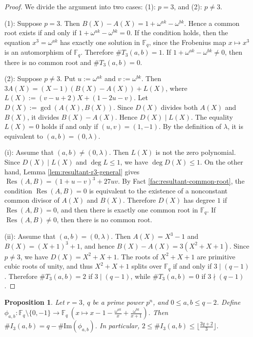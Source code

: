 \documentclass[10pt,a4paper]{article}
\newtheorem{prop}[thm]{Proposition}
\newcommand{\Res}{\operatorname{Res}}
\numberwithin{equation}{section}
\begin{document}
\begin{proof}
We divide the argument into two cases: \textup{(1)}: $p=3$, and \textup{(2)}: $p\neq 3$.

\noindent\textup{(1)}: Suppose $p=3$. Then $B(X)-A(X)=1+\omega^{ak}-\omega^{bk}$. Hence a common root exists if and only if $1+\omega^{ak}-\omega^{bk}=0$. If the condition holds, then the equation $x^3=\omega^{ak}$ has exactly one solution in $\mathbb{F}_q$, since the Frobenius map $x\mapsto x^3$ is an automorphism of $\mathbb{F}_q$. Therefore $\#T_3(a,b)=1$. If $1+\omega^{ak}-\omega^{bk}\neq 0$, then there is no common root and $\#T_3(a,b)=0$.

\noindent\textup{(2)}: Suppose $p\neq 3$. Put $u:=\omega^{ak}$ and $v:=\omega^{bk}$. Then $3A(X)=(X-1)(B(X)-A(X))+L(X)$, where $L(X):=(v-u+2)X+(1-2u-v)$. Let $D(X):=\gcd(A(X),B(X))$. Since $D(X)$ divides both $A(X)$ and $B(X)$, it divides $B(X)-A(X)$. Hence $D(X)\mid L(X)$. The equality $L(X)=0$ holds if and only if $(u,v)=(1,-1)$. By the definition of $\lambda$, it is equivalent to $(a,b)=(0,\lambda)$.

\textup{(i)}: Assume that $(a,b)\neq(0,\lambda)$. Then $L(X)$ is not the zero polynomial. Since $D(X)\mid L(X)$ and $\deg L\le1$, we have $\deg D(X)\le1$. On the other hand, Lemma \ref{lem:resultant-r3-general} gives $\Res(A,B)=(1+u-v)^3+27uv$. By Fact \ref{fac:resultant-common-root}, the condition $\Res(A,B)=0$ is equivalent to the existence of a nonconstant common divisor of $A(X)$ and $B(X)$. Therefore $D(X)$ has degree $1$ if $\Res(A,B)=0$, and then there is exactly one common root in $\mathbb{F}_q$. If $\Res(A,B)\neq0$, then there is no common root.

\textup{(ii)}: Assume that $(a,b)=(0,\lambda)$. Then $A(X)=X^3-1$ and $B(X)=(X+1)^3+1$, and hence $B(X)-A(X)=3(X^2+X+1)$. Since $p\neq3$, we have $D(X)=X^2+X+1$. The roots of $X^2+X+1$ are primitive cubic roots of unity, and thus $X^2+X+1$ splits over $\mathbb{F}_q$ if and only if $3\mid(q-1)$. Therefore $\#T_3(a,b)=2$ if $3\mid(q-1)$, while $\#T_3(a,b)=0$ if $3\nmid(q-1)$.
\end{proof}

\begin{prop}\label{lem:I-layer-r3-general}
Let $r=3$, $q$ be a prime power $p^n$, and $0\le a,b\le q-2$. Define $\phi_{a,b}:\mathbb{F}_q\setminus\{0,-1\}\to\mathbb{F}_q\ (x\mapsto x-1-\frac{\omega^{ak}}{x}+\frac{\omega^{bk}}{x+1})$. Then $\#I_{3}(a,b)=q-\#\mathrm{Im}(\phi_{a,b})$. In particular, $2\le \#I_{3}(a,b)\le \lfloor\frac{2q+2}{3}\rfloor$.
\end{prop}
\end{document}
